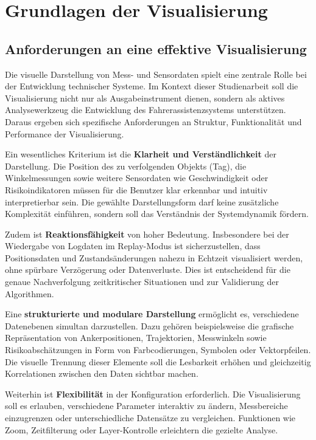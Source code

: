 \documentclass[a4paper, 12pt]{article} %
\begin{document}
\clearpage

\section{Grundlagen der Visualisierung}
\subsection{Anforderungen an eine effektive Visualisierung}

Die visuelle Darstellung von Mess- und Sensordaten spielt eine zentrale Rolle bei der Entwicklung technischer Systeme. 
Im Kontext dieser Studienarbeit soll die Visualisierung nicht nur als Ausgabeinstrument dienen, sondern als aktives Analysewerkzeug die 
Entwicklung des Fahrerassistenzsystems unterstützen. Daraus ergeben sich spezifische Anforderungen an Struktur, Funktionalität und Performance der 
Visualisierung.

Ein wesentliches Kriterium ist die \textbf{Klarheit und Verständlichkeit} der Darstellung. Die Position des zu 
verfolgenden Objekts (Tag), die Winkelmessungen sowie weitere Sensordaten wie Geschwindigkeit oder Risikoindikatoren müssen 
für die Benutzer klar erkennbar und intuitiv interpretierbar sein. Die gewählte Darstellungsform darf keine zusätzliche Komplexität 
einführen, sondern soll das Verständnis der Systemdynamik fördern.

Zudem ist \textbf{Reaktionsfähigkeit} von hoher Bedeutung. Insbesondere bei der Wiedergabe von Logdaten im Replay-Modus ist sicherzustellen, 
dass Positionsdaten und Zustandsänderungen nahezu in Echtzeit visualisiert werden, ohne spürbare Verzögerung oder Datenverluste. Dies ist entscheidend
 für die genaue Nachverfolgung zeitkritischer Situationen und zur Validierung der Algorithmen.

Eine \textbf{strukturierte und modulare Darstellung} ermöglicht es, verschiedene Datenebenen simultan darzustellen. 
Dazu gehören beispielsweise die grafische Repräsentation von Ankerpositionen, Trajektorien, Messwinkeln sowie Risikoabschätzungen in Form von 
Farbcodierungen, Symbolen oder Vektorpfeilen. Die visuelle Trennung dieser Elemente soll die Lesbarkeit erhöhen und gleichzeitig Korrelationen zwischen 
den Daten sichtbar machen.

Weiterhin ist \textbf{Flexibilität} in der Konfiguration erforderlich. Die Visualisierung soll es erlauben, verschiedene Parameter interaktiv zu 
ändern, Messbereiche einzugrenzen oder unterschiedliche Datensätze zu vergleichen. Funktionen wie Zoom, Zeitfilterung oder Layer-Kontrolle erleichtern 
die gezielte Analyse.
\end{document}
